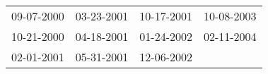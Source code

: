 \begin{supertabular}{llll}
 09-07-2000 &  03-23-2001 &  10-17-2001 &  10-08-2003 \\
 10-21-2000 &  04-18-2001 &  01-24-2002 &  02-11-2004 \\
 02-01-2001 &  05-31-2001 &  12-06-2002 &             \\
\end{supertabular}

